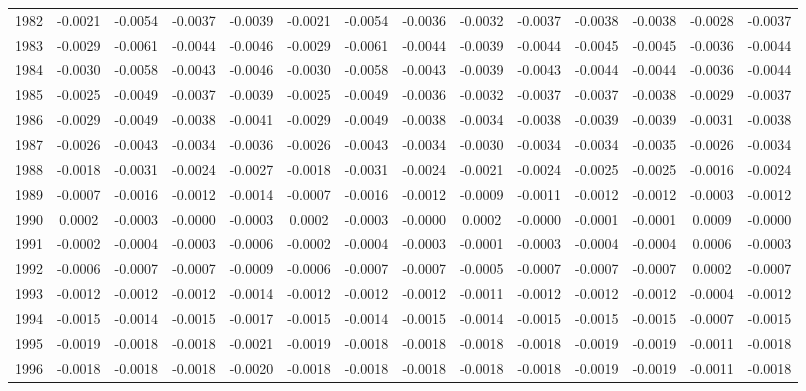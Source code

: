 \begin{tabular}{cccccccccccccc}
  1982 & -0.0021 & -0.0054 & -0.0037 & -0.0039 & -0.0021 & -0.0054 & -0.0036 & -0.0032 & -0.0037 & -0.0038 & -0.0038 & -0.0028 & -0.0037 \\ 
  1983 & -0.0029 & -0.0061 & -0.0044 & -0.0046 & -0.0029 & -0.0061 & -0.0044 & -0.0039 & -0.0044 & -0.0045 & -0.0045 & -0.0036 & -0.0044 \\ 
  1984 & -0.0030 & -0.0058 & -0.0043 & -0.0046 & -0.0030 & -0.0058 & -0.0043 & -0.0039 & -0.0043 & -0.0044 & -0.0044 & -0.0036 & -0.0044 \\ 
  1985 & -0.0025 & -0.0049 & -0.0037 & -0.0039 & -0.0025 & -0.0049 & -0.0036 & -0.0032 & -0.0037 & -0.0037 & -0.0038 & -0.0029 & -0.0037 \\ 
  1986 & -0.0029 & -0.0049 & -0.0038 & -0.0041 & -0.0029 & -0.0049 & -0.0038 & -0.0034 & -0.0038 & -0.0039 & -0.0039 & -0.0031 & -0.0038 \\ 
  1987 & -0.0026 & -0.0043 & -0.0034 & -0.0036 & -0.0026 & -0.0043 & -0.0034 & -0.0030 & -0.0034 & -0.0034 & -0.0035 & -0.0026 & -0.0034 \\ 
  1988 & -0.0018 & -0.0031 & -0.0024 & -0.0027 & -0.0018 & -0.0031 & -0.0024 & -0.0021 & -0.0024 & -0.0025 & -0.0025 & -0.0016 & -0.0024 \\ 
  1989 & -0.0007 & -0.0016 & -0.0012 & -0.0014 & -0.0007 & -0.0016 & -0.0012 & -0.0009 & -0.0011 & -0.0012 & -0.0012 & -0.0003 & -0.0012 \\ 
  1990 & 0.0002 & -0.0003 & -0.0000 & -0.0003 & 0.0002 & -0.0003 & -0.0000 & 0.0002 & -0.0000 & -0.0001 & -0.0001 & 0.0009 & -0.0000 \\ 
  1991 & -0.0002 & -0.0004 & -0.0003 & -0.0006 & -0.0002 & -0.0004 & -0.0003 & -0.0001 & -0.0003 & -0.0004 & -0.0004 & 0.0006 & -0.0003 \\ 
  1992 & -0.0006 & -0.0007 & -0.0007 & -0.0009 & -0.0006 & -0.0007 & -0.0007 & -0.0005 & -0.0007 & -0.0007 & -0.0007 & 0.0002 & -0.0007 \\ 
  1993 & -0.0012 & -0.0012 & -0.0012 & -0.0014 & -0.0012 & -0.0012 & -0.0012 & -0.0011 & -0.0012 & -0.0012 & -0.0012 & -0.0004 & -0.0012 \\ 
  1994 & -0.0015 & -0.0014 & -0.0015 & -0.0017 & -0.0015 & -0.0014 & -0.0015 & -0.0014 & -0.0015 & -0.0015 & -0.0015 & -0.0007 & -0.0015 \\ 
  1995 & -0.0019 & -0.0018 & -0.0018 & -0.0021 & -0.0019 & -0.0018 & -0.0018 & -0.0018 & -0.0018 & -0.0019 & -0.0019 & -0.0011 & -0.0018 \\ 
  1996 & -0.0018 & -0.0018 & -0.0018 & -0.0020 & -0.0018 & -0.0018 & -0.0018 & -0.0018 & -0.0018 & -0.0019 & -0.0019 & -0.0011 & -0.0018 \\ 

\end{tabular}
